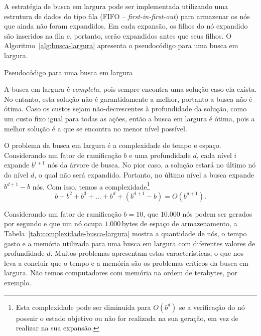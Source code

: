 A estratégia de busca em largura pode ser implementada utilizando uma estrutura de dados do tipo fila (FIFO -- \textit{first-in-first-out}) para armazenar os nós que ainda não foram expandidos. Em cada expansão, os filhos do nó expandido são inseridos na fila e, portanto, serão expandidos antes que seus filhos. O Algoritmo~\ref{alg:busca-largura} apresenta o pseudocódigo para uma busca em largura.

\begin{algorithm}[h]
	\DontPrintSemicolon
	
	
	\caption{Pseudocódigo para uma busca em largura}
	\label{alg:busca-largura}
\end{algorithm}

A busca em largura é \textit{completa}, pois sempre encontra uma solução caso ela exista. No entanto, esta solução não é garantidamente a melhor, portanto a busca não é ótima. Caso os custos sejam não-decrescentes à profundidade da solução, como um custo fixo igual para todas as ações, então a busca em largura é ótima, pois a melhor solução é a que se encontra no menor nível possível.

O problema da busca em largura é a complexidade de tempo e espaço. Considerando um fator de ramificação $b$ e uma profundidade $d$, cada nível $i$ expande $b^{i+1}$ nós da árvore de busca. No pior caso, a solução estará no último nó do nível $d$, o qual não será expandido. Portanto, no último nível a busca expande $b^{d+1} - b$ nós. Com isso, temos a complexidade\footnote{Esta complexidade pode ser diminuída para $O(b^d)$ se a verificação do nó possuir o estado objetivo ou não for realizada na sua geração, em vez de realizar na sua expansão.}
$$
b + b^2 + b^3 + \ldots + b^d + (b^{d+1} - b) = O(b^{d+1}).
$$

Considerando um fator de ramificação $b = 10$, que $10.000$ nós podem ser gerados por segundo e que um nó ocupa $1.000$\,bytes de espaço de armazenamento, a Tabela~\ref{tab:complexidade-busca-largura} mostra a quantidade de nós, o tempo gasto e a memória utilizada para uma busca em largura com diferentes valores de profundidade $d$. Muitos problemas apresentam estas características, o que nos leva a concluir que o tempo e a memória são os problemas críticos da busca em largura. Não temos computadores com memória na ordem de terabytes, por exemplo.

